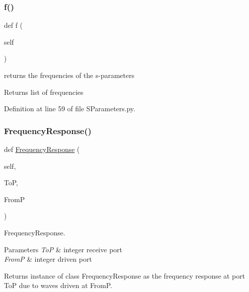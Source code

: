 \subsubsection{\texorpdfstring{f()}{f()}}
{\footnotesize\ttfamily def f (\begin{DoxyParamCaption}\item[{}]{self }\end{DoxyParamCaption})}



returns the frequencies of the s-\/parameters 

\begin{DoxyReturn}{Returns}
list of frequencies 
\end{DoxyReturn}


Definition at line 59 of file S\+Parameters.\+py.

\mbox{\label{classSignalIntegrity_1_1SParameters_1_1SParameters_1_1SParameters_a55a7157cd888766a891ff22694e62613}} 
\subsubsection{\texorpdfstring{Frequency\+Response()}{FrequencyResponse()}}
{\footnotesize\ttfamily def \hyperlink{classSignalIntegrity_1_1FrequencyDomain_1_1FrequencyResponse_1_1FrequencyResponse}{Frequency\+Response} (\begin{DoxyParamCaption}\item[{}]{self,  }\item[{}]{ToP,  }\item[{}]{FromP }\end{DoxyParamCaption})}



Frequency\+Response. 


\begin{DoxyParams}{Parameters}
{\em ToP} & integer receive port \\
\hline
{\em FromP} & integer driven port \\
\hline
\end{DoxyParams}
\begin{DoxyReturn}{Returns}
instance of class Frequency\+Response as the frequency response at port ToP due to waves driven at FromP. 
\end{DoxyReturn}


